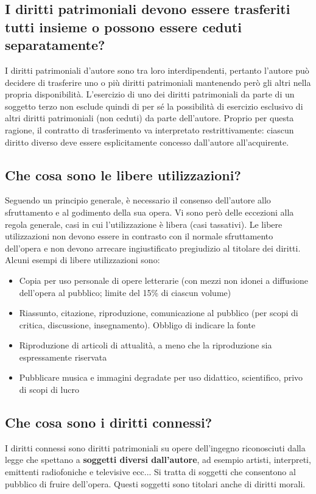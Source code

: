 \subsection{I diritti patrimoniali devono essere trasferiti tutti insieme o possono essere ceduti separatamente?}
I diritti patrimoniali d'autore sono tra loro interdipendenti, pertanto l'autore può decidere di trasferire uno
o più diritti patrimoniali mantenendo però gli altri nella propria disponibilità. L'esercizio di uno dei diritti patrimoniali
da parte di un soggetto terzo non esclude quindi di per sé la possibilità di esercizio esclusivo di altri diritti
patrimoniali (non ceduti) da parte dell'autore. Proprio per questa ragione, il contratto di trasferimento va interpretato
restrittivamente: ciascun diritto diverso deve essere esplicitamente concesso dall'autore all'acquirente.

\subsection{Che cosa sono le libere utilizzazioni?}
Seguendo un principio generale, è necessario il consenso dell'autore allo sfruttamento e al godimento della sua opera. \newline
Vi sono però delle eccezioni alla regola generale, casi in cui l'utilizzazione è libera (casi tassativi).\newline
Le libere utilizzazioni non devono essere in contrasto con il normale sfruttamento dell'opera e non devono arrecare
ingiustificato pregiudizio al titolare dei diritti.\newline
Alcuni esempi di libere utilizzazioni sono:
\begin{itemize}
    \item Copia per uso personale di opere letterarie (con mezzi non idonei a diffusione dell'opera al pubblico;
    limite del 15\% di ciascun volume)
    \item Riassunto, citazione, riproduzione, comunicazione al pubblico (per scopi di critica, discussione, insegnamento).
    Obbligo di indicare la fonte
    \item Riproduzione di articoli di attualità, a meno che la riproduzione sia espressamente riservata
    \item Pubblicare musica e immagini degradate per uso didattico, scientifico, privo di scopi di lucro
\end{itemize}

\subsection{Che cosa sono i diritti connessi?}
I diritti connessi sono diritti patrimoniali su opere dell'ingegno riconosciuti dalla legge che spettano a \textbf{soggetti diversi
dall'autore}, ad esempio artisti, interpreti, emittenti radiofoniche e televisive ecc... \newline
Si tratta di soggetti che consentono al pubblico di fruire dell'opera. Questi soggetti sono titolari anche di diritti morali.

